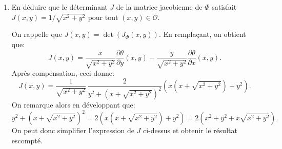 \documentclass[a4paper]{tp_um}
\begin{document}
\begin{enumerate}
 \medskip 


\item En d\'eduire que le déterminant $J$ de la matrice jacobienne de $\Phi$ satisfait $J(x,y) = 1/\sqrt{x^2+y^2}$ pour tout
$(x,y) \in \mathcal O.$

\medskip

On rappelle que $J(x,y) = \det (J_{\Phi}(x,y))$. En rempla\c{c}ant, on obtient que:
\[
J(x,y) = \dfrac{x}{\sqrt{x^2+y^2}} \frac{\partial \theta}{\partial y}(x,y) - \dfrac{y}{\sqrt{x^2+y^2}} \frac{\partial \theta}{\partial x}(x,y).
\]
Apr\`es compensation, ceci-donne:
\[
J(x,y) = \dfrac{1}{\sqrt{x^2+y^2}} \, \dfrac{2}{y^2 + (x+\sqrt{x^2+y^2})^2} \left( x(x+\sqrt{x^2+y^2}) + y^2\right).
\]
On remarque alors en d\'eveloppant que:
\[
y^2 + (x+\sqrt{x^2+y^2})^2 = 2 \left( x(x+\sqrt{x^2+y^2}) + y^2 \right) = 2\left(x^2 + y^2 + x\sqrt{x^2+y^2}\right).
\]
On peut donc simplifier l'expression de $J$ ci-dessus et obtenir le r\'esultat escompt\'e.
\bigskip
\end{enumerate}
\end{document}
